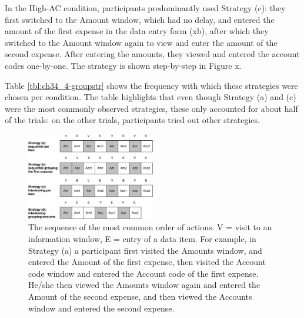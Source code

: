 In the High-AC condition, participants predominantly used Strategy (c): they first switched to the Amount window, which had no delay, and entered the amount of the first expense in the data entry form (xb), after which they switched to the Amount window again to view and enter the amount of the second expense. After entering the amounts, they viewed and entered the account codes one-by-one. The strategy is shown step-by-step in Figure x. 

Table \ref{tbl:ch34_4-groupstr} shows the frequency with which these strategies were chosen per condition. The table highlights that even though Strategy (a) and (c) were the most commonly observed strategies, these only accounted for about half of the trials: on the other  trials, participants tried out other strategies.  



\begin{figure}[!ht]
  \centering
    \includegraphics[width=0.5\textwidth]{images/ch34/ch34-4_OrderStrategies.pdf}
      \caption{The sequence of the most common order of actions. V = visit to an information window, E = entry of a data item. For example, in Strategy (a) a participant first visited the Amounts window, and entered the Amount of the first expense, then visited the Account code window and entered the Account code of the first expense. He/she then viewed the Amounts window again and entered the Amount of the second expense, and then viewed the Accounts window and entered the second expense.}
          \label{fig:ch34_4-groupstr}
\end{figure}


